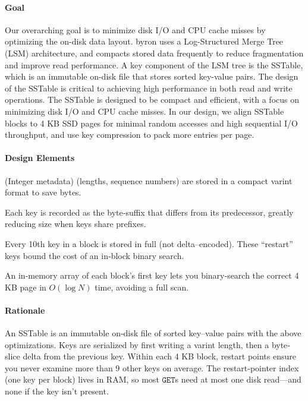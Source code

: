 \documentclass[10pt]{article}
\begin{document}
\paragraph{Goal}
Our overarching goal is to minimize disk I/O and CPU cache misses by optimizing the on-disk data layout.
byron uses a Log-Structured Merge Tree (LSM) architecture, and compacts stored data frequently to reduce fragmentation and improve read performance.
A key component of the LSM tree is the SSTable, which is an immutable on-disk file that stores sorted key-value pairs. The design of the SSTable is critical to achieving high performance in both read and write operations.
The SSTable is designed to be compact and efficient, with a focus on minimizing disk I/O and CPU cache misses.
In our design, we align SSTable blocks to 4 KB SSD pages for minimal random accesses and high sequential I/O throughput, and use key compression to pack more entries per page.

\paragraph{Design Elements}

\begin{description}[leftmargin=1em,labelwidth=*,itemsep=0.5ex]
  \item[Varint Encoding] (Integer metadata) (lengths, sequence numbers) are stored in a compact varint format to save bytes.
  \item[Delta Encoding (Prefix Compression)] Each key is recorded as the byte‐suffix that differs from its predecessor, greatly reducing size when keys share prefixes.
  \item[Restart Points] Every 10th key in a block is stored in full (not delta–encoded).  These “restart” keys bound the cost of an in‐block binary search.
  \item[Page Hash Index] An in‐memory array of each block’s first key lets you binary‐search the correct 4 KB page in $O(\log N)$ time, avoiding a full scan.
\end{description}

\paragraph{Rationale}
An SSTable is an immutable on‐disk file of sorted key–value pairs with the above optimizations.
Keys are serialized by first writing a varint length, then a byte‐slice delta from the previous key.
Within each 4 KB block, restart points ensure you never examine more than 9 other keys on average.
The restart‐pointer index (one key per block) lives in RAM, so most $\mathtt{GET}$s need at most one disk read—and none if the key isn’t present.
\end{document}
